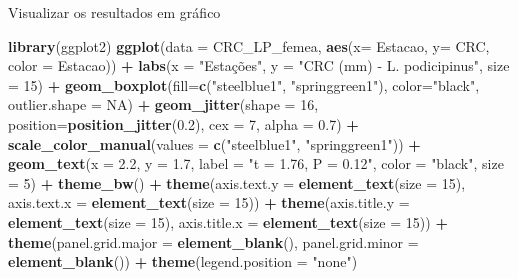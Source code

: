 \documentclass[
]{book}
\newenvironment{Shaded}{\begin{snugshade}}{\end{snugshade}}
\newcommand{\DataTypeTok}[1]{\textcolor[rgb]{0.13,0.29,0.53}{#1}}
\newcommand{\DecValTok}[1]{\textcolor[rgb]{0.00,0.00,0.81}{#1}}
\newcommand{\FloatTok}[1]{\textcolor[rgb]{0.00,0.00,0.81}{#1}}
\newcommand{\KeywordTok}[1]{\textcolor[rgb]{0.13,0.29,0.53}{\textbf{#1}}}
\newcommand{\NormalTok}[1]{#1}
\newcommand{\OperatorTok}[1]{\textcolor[rgb]{0.81,0.36,0.00}{\textbf{#1}}}
\newcommand{\OtherTok}[1]{\textcolor[rgb]{0.56,0.35,0.01}{#1}}
\newcommand{\StringTok}[1]{\textcolor[rgb]{0.31,0.60,0.02}{#1}}
\begin{document}
Visualizar os resultados em gráfico

\begin{Shaded}
\begin{Highlighting}[]
\KeywordTok{library}\NormalTok{(ggplot2)}
\KeywordTok{ggplot}\NormalTok{(}\DataTypeTok{data =}\NormalTok{ CRC_LP_femea, }\KeywordTok{aes}\NormalTok{(}\DataTypeTok{x=}\NormalTok{ Estacao, }\DataTypeTok{y=}\NormalTok{ CRC, }\DataTypeTok{color =}\NormalTok{ Estacao)) }\OperatorTok{+}\StringTok{ }
\StringTok{  }\KeywordTok{labs}\NormalTok{(}\DataTypeTok{x =} \StringTok{"Estações"}\NormalTok{, }\DataTypeTok{y =} \StringTok{"CRC (mm) - L. podicipinus"}\NormalTok{, }\DataTypeTok{size =} \DecValTok{15}\NormalTok{) }\OperatorTok{+}
\StringTok{  }\KeywordTok{geom_boxplot}\NormalTok{(}\DataTypeTok{fill=}\KeywordTok{c}\NormalTok{(}\StringTok{"steelblue1"}\NormalTok{, }\StringTok{"springgreen1"}\NormalTok{), }\DataTypeTok{color=}\StringTok{"black"}\NormalTok{, }\DataTypeTok{outlier.shape =} \OtherTok{NA}\NormalTok{) }\OperatorTok{+}
\StringTok{  }\KeywordTok{geom_jitter}\NormalTok{(}\DataTypeTok{shape =} \DecValTok{16}\NormalTok{, }\DataTypeTok{position=}\KeywordTok{position_jitter}\NormalTok{(}\FloatTok{0.2}\NormalTok{), }\DataTypeTok{cex =} \DecValTok{7}\NormalTok{, }\DataTypeTok{alpha =} \FloatTok{0.7}\NormalTok{) }\OperatorTok{+}
\StringTok{  }\KeywordTok{scale_color_manual}\NormalTok{(}\DataTypeTok{values =} \KeywordTok{c}\NormalTok{(}\StringTok{"steelblue1"}\NormalTok{, }\StringTok{"springgreen1"}\NormalTok{)) }\OperatorTok{+}
\StringTok{  }\KeywordTok{geom_text}\NormalTok{(}\DataTypeTok{x =} \FloatTok{2.2}\NormalTok{, }\DataTypeTok{y =} \FloatTok{1.7}\NormalTok{, }\DataTypeTok{label =} \StringTok{"t = 1.76, P = 0.12"}\NormalTok{, }\DataTypeTok{color =} \StringTok{"black"}\NormalTok{, }\DataTypeTok{size =} \DecValTok{5}\NormalTok{) }\OperatorTok{+}
\StringTok{  }\KeywordTok{theme_bw}\NormalTok{() }\OperatorTok{+}
\StringTok{  }\KeywordTok{theme}\NormalTok{(}\DataTypeTok{axis.text.y =} \KeywordTok{element_text}\NormalTok{(}\DataTypeTok{size =} \DecValTok{15}\NormalTok{), }\DataTypeTok{axis.text.x =} \KeywordTok{element_text}\NormalTok{(}\DataTypeTok{size =} \DecValTok{15}\NormalTok{)) }\OperatorTok{+}
\StringTok{  }\KeywordTok{theme}\NormalTok{(}\DataTypeTok{axis.title.y =} \KeywordTok{element_text}\NormalTok{(}\DataTypeTok{size =} \DecValTok{15}\NormalTok{), }\DataTypeTok{axis.title.x =} \KeywordTok{element_text}\NormalTok{(}\DataTypeTok{size =} \DecValTok{15}\NormalTok{)) }\OperatorTok{+}
\StringTok{  }\KeywordTok{theme}\NormalTok{(}\DataTypeTok{panel.grid.major =} \KeywordTok{element_blank}\NormalTok{(), }\DataTypeTok{panel.grid.minor =} \KeywordTok{element_blank}\NormalTok{()) }\OperatorTok{+}
\StringTok{  }\KeywordTok{theme}\NormalTok{(}\DataTypeTok{legend.position =} \StringTok{"none"}\NormalTok{)}
\end{Highlighting}
\end{Shaded}
\end{document}
